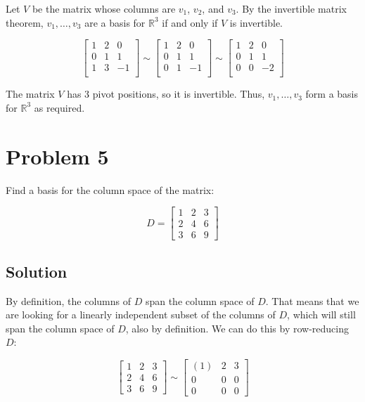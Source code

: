 \documentclass{zupan}
\begin{document}
\begin{solution}
  Let $V$ be the matrix whose columns are $v_1$, $v_2$, and $v_3$. By the
  invertible matrix theorem, $v_1, \dots, v_3$ are a basis for $\mathbb{R}^3$
  if and only if $V$ is invertible.

  \[
    \begin{bmatrix}
      1 & 2 & 0 \\
      0 & 1 & 1 \\
      1 & 3 & -1 \\
    \end{bmatrix}
    \sim \begin{bmatrix}
      1 & 2 & 0 \\
      0 & 1 & 1 \\
      0 & 1 & -1 \\
    \end{bmatrix}
    \sim \begin{bmatrix}
      1 & 2 & 0 \\
      0 & 1 & 1 \\
      0 & 0 & -2 \\
    \end{bmatrix}
  \]

  The matrix $V$ has 3 pivot positions, so it is invertible. Thus, $v_1, \dots,
  v_3$ form a basis for $\mathbb{R}^3$ as required.
\end{solution}

\section*{Problem 5}

Find a basis for the column space of the matrix:

\[
  D = \begin{bmatrix}
    1 & 2 & 3 \\
    2 & 4 & 6 \\
    3 & 6 & 9
  \end{bmatrix}
\]

\subsection*{Solution}

By definition, the columns of \(D\) span the column space of \(D\). That means
that we are looking for a linearly independent subset of the columns of \(D\),
which will still span the column space of \(D\), also by definition. We can do
this by row-reducing \(D\):

\[
  \begin{bmatrix}
    1 & 2 & 3 \\
    2 & 4 & 6 \\
    3 & 6 & 9
  \end{bmatrix}
  \sim \begin{bmatrix}
    (1) & 2 & 3 \\
    0 & 0 & 0 \\
    0 & 0 & 0
  \end{bmatrix}
\]
\end{document}
